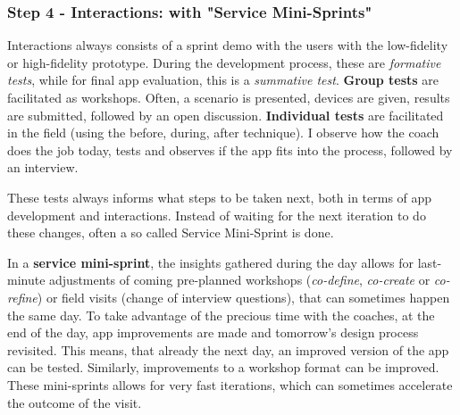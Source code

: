   \subsubsection{Step 4 - Interactions: with "Service Mini-Sprints"}
  Interactions always consists of a sprint demo with the users with the low-fidelity or high-fidelity prototype. During the development process, these are \textit{formative tests}, while for final app evaluation, this is a \textit{summative test}. \textbf{Group tests} are facilitated as workshops. Often, a scenario is presented, devices are given, results are submitted, followed by an open discussion. \textbf{Individual tests} are facilitated in the field (using the before, during, after technique). I observe how the coach does the job today, tests and observes if the app fits into the process, followed by an interview.

    These tests always informs what steps to be taken next, both in terms of app development and interactions. Instead of waiting for the next iteration to do these changes, often a so called Service Mini-Sprint is done.

    In a \textbf{service mini-sprint}\label{mini-sprint}, the insights gathered during the day allows for last-minute adjustments of coming pre-planned workshops (\textit{co-define}, \textit{co-create} or \textit{co-refine}) or field visits (change of interview questions), that can sometimes happen the same day. To take advantage of the precious time with the coaches, at the end of the day, app improvements are made and tomorrow's design process revisited. This means, that already the next day, an improved version of the app can be tested. Similarly, improvements to a workshop format can be improved. These mini-sprints allows for very fast iterations, which can sometimes accelerate the outcome of the visit.
